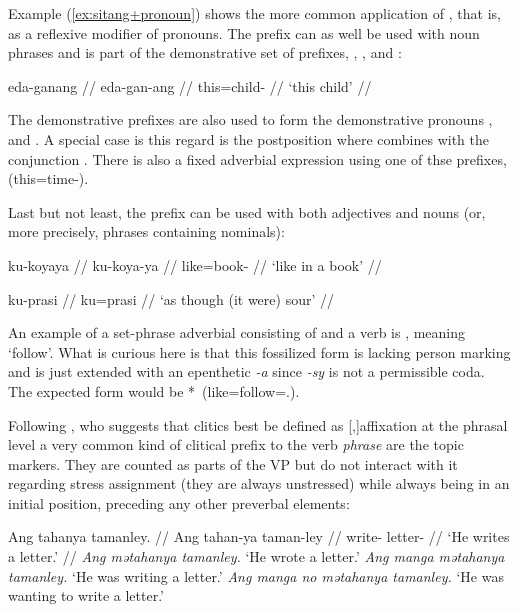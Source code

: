 Example (\ref{ex:sitang+pronoun}) shows the more common application of 
, that is, as a reflexive modifier of pronouns. The 
prefix  can as well be used with noun phrases and is part of the 
demonstrative set of prefixes, , , and 
:

\ex\begingl
	\gla eda-ganang //
	\glb eda-gan-ang //
	\glc this=child-\Aarg{} //
	\glft `this child' //
\endgl\xe

The demonstrative prefixes are also used to form the demonstrative 
pronouns , 
 and . A special case is 
this regard is the postposition  
where  combines with the conjunction . There is also a fixed adverbial expression using one of 
thse prefixes,  
(this=time-\Dat{}).

Last but not least, the prefix  can be used 
with both adjectives and nouns (or, more precisely, phrases containing 
nominals):

\pex
\a\begingl
	\gla ku-koyaya //
	\glb ku-koya-ya //
	\glc like=book-\Loc{} //
	\glft `like in a book' //
\endgl

\a\begingl
	\gla ku-prasi //
	\glb ku=prasi //
	\glft `as though (it were) sour' //
\endgl
\xe

An example of a set-phrase adverbial consisting of  and a verb 
is ,  meaning `follow'. 
What is curious here is that this fossilized form is lacking person marking 
and is just extended with an epenthetic \textit{-a} since \textit{-sy} is not 
a permissible coda. The expected form would be 
*\, (like=follow=\TsgI{}.\Aarg{}).

Following \citet{klavans1985}, who suggests that clitics best be defined as 
[,]{affixation at the phrasal level} a very common 
kind of clitical prefix to the verb \emph{phrase} are the topic markers. They 
are counted as parts of the VP but do not interact with it regarding stress 
assignment (they are always unstressed) while always being in an initial 
position, preceding any other preverbal elements:

\pex
	\a\begingl
		\gla Ang tahanya tamanley. //
		\glb Ang tahan-ya taman-ley //
		\glc \AgtT{} write-\TsgM{} letter-\PargI{} //
		\glft `He writes a letter.' //
	\endgl
	\a \textit{Ang mətahanya tamanley.} `He wrote a letter.'
	\a \textit{Ang manga mətahanya tamanley.} `He was writing a letter.'
	\a \textit{Ang manga no mətahanya tamanley.} `He was wanting to write a 
		letter.'
\xe

